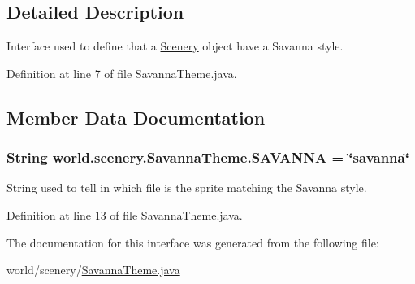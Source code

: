 \subsection{Detailed Description}
Interface used to define that a \hyperlink{a00024}{Scenery} object have a Savanna style. 

Definition at line 7 of file Savanna\-Theme.\-java.



\subsection{Member Data Documentation}
\hypertarget{a00023_a69e8a9867db3a93074a41573940424b2}{
\subsubsection[{S\-A\-V\-A\-N\-N\-A}]{\setlength{\rightskip}{0pt plus 5cm}String world.\-scenery.\-Savanna\-Theme.\-S\-A\-V\-A\-N\-N\-A = \char`\"{}savanna\char`\"{}\hspace{0.3cm}{\ttfamily [static]}}}\label{a00023_a69e8a9867db3a93074a41573940424b2}


String used to tell in which file is the sprite matching the Savanna style. 



Definition at line 13 of file Savanna\-Theme.\-java.



The documentation for this interface was generated from the following file\-:\begin{DoxyCompactItemize}
\item 
world/scenery/\hyperlink{a00069}{Savanna\-Theme.\-java}\end{DoxyCompactItemize}
